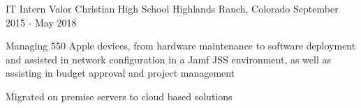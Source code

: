 \begin{cventries}
  \cventry
    {IT Intern}
    {Valor Christian High School }
    {Highlands Ranch, Colorado} %
    {September 2015 - May 2018} %
    {
      \begin{cvitems} %
        \item {Managing 550 Apple devices, from hardware maintenance
            to software deployment and assisted in network
            configuration in a Jamf JSS environment, as well as
            assisting in budget approval and project management}
        \item {Migrated on premise servers to cloud based solutions}
      \end{cvitems}
    }
    \fi
\end{cventries}
